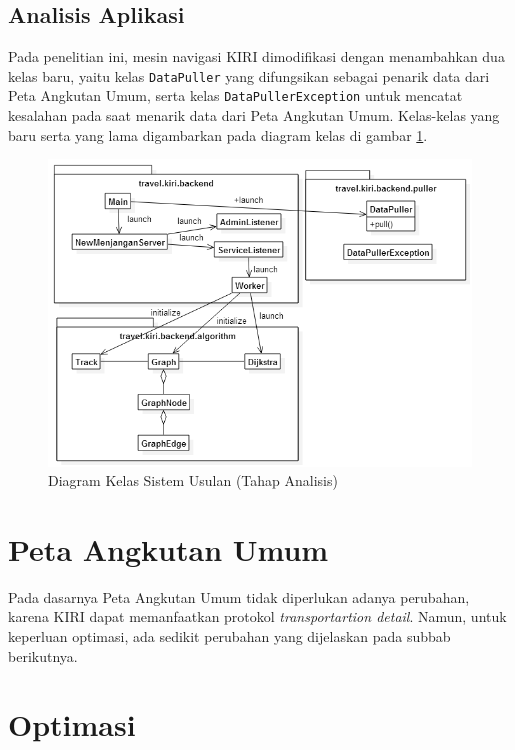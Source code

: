 \subsection{Analisis Aplikasi}

Pada penelitian ini, mesin navigasi KIRI dimodifikasi dengan menambahkan dua kelas baru, yaitu kelas \texttt{DataPuller} yang difungsikan sebagai penarik data dari Peta Angkutan Umum, serta kelas \texttt{DataPullerException} untuk mencatat kesalahan pada saat menarik data dari Peta Angkutan Umum. Kelas-kelas yang baru serta yang lama digambarkan pada diagram kelas di gambar \ref{fig:3_diagram_kelas_sistem_usulan}.

\begin{figure}
	\centering
	\includegraphics[scale=0.5]{Gambar/3_diagram_kelas_sistem_usulan}
	\caption{Diagram Kelas Sistem Usulan (Tahap Analisis)} 
	\label{fig:3_diagram_kelas_sistem_usulan}
\end{figure}

\section{Peta Angkutan Umum}

Pada dasarnya Peta Angkutan Umum tidak diperlukan adanya perubahan, karena KIRI dapat memanfaatkan protokol \textit{transportartion detail}. Namun, untuk keperluan optimasi, ada sedikit perubahan yang dijelaskan pada subbab berikutnya.

\section{Optimasi}

